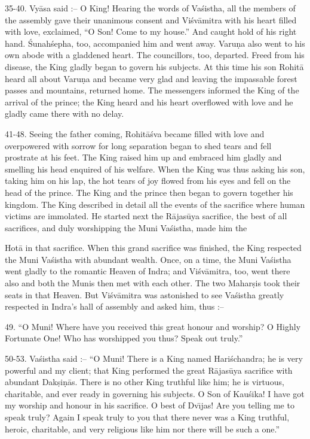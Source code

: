 35-40. Vy\=asa said :-- O King! Hearing the words of Va\'sistha, all the members of the assembly gave their unanimous consent and Vi\'sv\=amitra with his heart filled with love, exclaimed, ``O Son! Come to my house.'' And caught hold of his right hand. \'Sunah\'sepha, too, accompanied him and went away. Varu\d{n}a also went to his own abode with a gladdened heart. The councillors, too, departed. Freed from his disease, the King gladly began to govern his subjects. At this time his son Rohit\=a heard all about Varu\d{n}a and became very glad and leaving the impassable forest passes and mountains, returned home. The messengers informed the King of the arrival of the prince; the King heard and his heart overflowed with love and he gladly came there with no delay.

41-48. Seeing the father coming, Rohit\=a\'sva became filled with love and overpowered with sorrow for long separation began to shed tears and fell prostrate at his feet. The King raised him up and embraced him gladly and smelling his head enquired of his welfare. When the King was thus asking his son, taking him on his lap, the hot tears of joy flowed from his eyes and fell on the head of the prince. The King and the prince then began to govern together his kingdom. The King described in detail all the events of the sacrifice where human victims are immolated. He started next the R\=ajas\=uya sacrifice, the best of all sacrifices, and duly worshipping the Muni Va\'sistha, made him the

Hot\=a in that sacrifice. When this grand sacrifice was finished, the King respected the Muni Va\'sistha with abundant wealth. Once, on a time, the Muni Va\'sistha went gladly to the romantic Heaven of Indra; and Vi\'sv\=amitra, too, went there also and both the Munis then met with each other. The two Mahar\d{s}is took their seats in that Heaven. But Vi\'sv\=amitra was astonished to see Va\'sistha greatly respected in Indra's hall of assembly and asked him, thus :--

49. ``O Muni! Where have you received this great honour and worship? O Highly Fortunate One! Who has worshipped you thus? Speak out truly.''

50-53. Va\'sistha said :-- ``O Muni! There is a King named Hari\'schandra; he is very powerful and my client; that King performed the great R\=ajas\=uya sacrifice with abundant Dak\d{s}i\d{n}\=as. There is no other King truthful like him; he is virtuous, charitable, and ever ready in governing his subjects. O Son of Kau\'sika! I have got my worship and honour in his sacrifice. O best of Dv\={\i}jas! Are you telling me to speak truly? Again I speak truly to you that there never was a King truthful, heroic, charitable, and very religious like him nor there will be such a one.''


